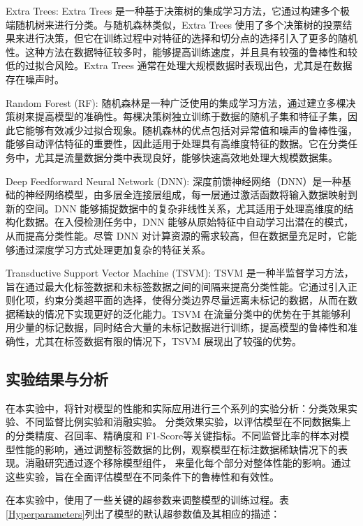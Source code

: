 \documentclass[promaster]{thesis-uestc}
\begin{document}
Extra Trees: Extra Trees 是一种基于决策树的集成学习方法，它通过构建多个极端随机树来进行分类。与随机森林类似，Extra Trees 使用了多个决策树的投票结果来进行决策，但它在训练过程中对特征的选择和切分点的选择引入了更多的随机性。这种方法在数据特征较多时，能够提高训练速度，并且具有较强的鲁棒性和较低的过拟合风险。Extra Trees 通常在处理大规模数据时表现出色，尤其是在数据存在噪声时。

Random Forest (RF): 随机森林是一种广泛使用的集成学习方法，通过建立多棵决策树来提高模型的准确性。每棵决策树独立训练于数据的随机子集和特征子集，因此它能够有效减少过拟合现象。随机森林的优点包括对异常值和噪声的鲁棒性强，能够自动评估特征的重要性，因此适用于处理具有高维度特征的数据。它在分类任务中，尤其是流量数据分类中表现良好，能够快速高效地处理大规模数据集。

Deep Feedforward Neural Network (DNN): 深度前馈神经网络（DNN）是一种基础的神经网络模型，由多层全连接层组成，每一层通过激活函数将输入数据映射到新的空间。DNN 能够捕捉数据中的复杂非线性关系，尤其适用于处理高维度的结构化数据。在入侵检测任务中，DNN 能够从原始特征中自动学习出潜在的模式，从而提高分类性能。尽管 DNN 对计算资源的需求较高，但在数据量充足时，它能够通过深度学习方式处理更加复杂的特征关系。

Transductive Support Vector Machine (TSVM): TSVM 是一种半监督学习方法，旨在通过最大化标签数据和未标签数据之间的间隔来提高分类性能。它通过引入正则化项，约束分类超平面的选择，使得分类边界尽量远离未标记的数据，从而在数据稀缺的情况下实现更好的泛化能力。TSVM 在流量分类中的优势在于其能够利用少量的标记数据，同时结合大量的未标记数据进行训练，提高模型的鲁棒性和准确性，尤其在标签数据有限的情况下，TSVM 展现出了较强的优势。

\subsection{实验结果与分析}

在本实验中，将针对模型的性能和实际应用进行三个系列的实验分析：分类效果实验、不同监督比例实验和消融实验。
分类效果实验，以评估模型在不同数据集上的分类精度、召回率、精确度和 F1-Score等关键指标。不同监督比率的样本对模型性能的影响，通过调整标签数据的比例，观察模型在标注数据稀缺情况下的表现。消融研究通过逐个移除模型组件，
来量化每个部分对整体性能的影响。通过这些实验，旨在全面评估模型在不同条件下的鲁棒性和有效性。

在本实验中，使用了一些关键的超参数来调整模型的训练过程。表\ref{Hyperparameters}列出了模型的默认超参数值及其相应的描述：
\end{document}

